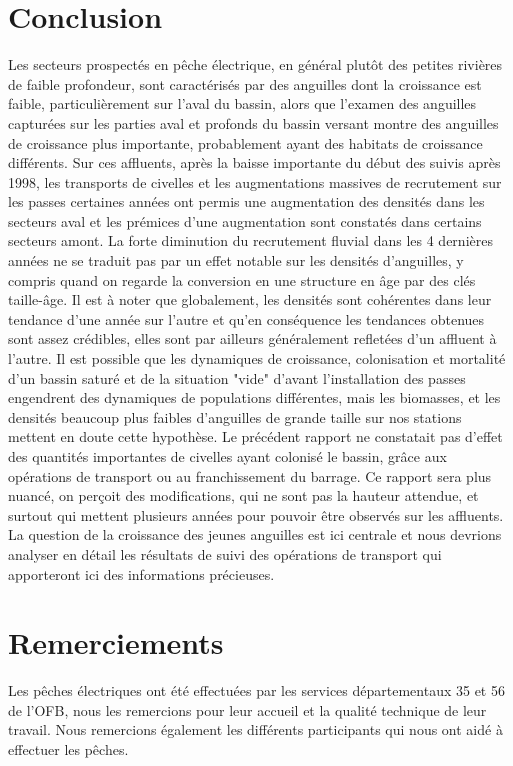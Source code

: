 \documentclass[10pt,twocolumn,titlepage,twoside]{article}\usepackage[]{graphicx}\usepackage[]{color}
\begin{document}
\section[Conclusion]{Conclusion}
Les secteurs prospectés en pêche électrique, en général plutôt des petites
rivières de faible profondeur, sont caractérisés par des anguilles dont la
croissance est faible, particulièrement sur l'aval du bassin, 
alors que l'examen des anguilles capturées sur les parties aval et profonds du bassin
versant montre des anguilles de croissance plus importante, probablement ayant
des habitats de croissance différents. Sur ces affluents, après la baisse
importante du début des suivis après 1998, les transports de civelles et les
augmentations massives de recrutement sur les passes certaines années ont permis
une augmentation des densités dans les secteurs aval et les prémices d'une
augmentation sont constatés dans certains secteurs amont. 
La forte diminution du recrutement fluvial dans les 4 dernières années ne se
traduit pas par un effet notable sur les densités d'anguilles, y compris quand
on regarde la conversion en une structure en âge par des clés taille-âge.
Il est à noter que globalement, les densités sont cohérentes dans leur tendance d'une année sur 
l'autre et qu'en conséquence les tendances
obtenues sont assez crédibles, elles sont par ailleurs généralement refletées
d'un affluent à l'autre.
Il est possible que les dynamiques de croissance, colonisation et mortalité d'un
bassin saturé et de la situation "vide" d'avant l'installation des passes
engendrent des dynamiques de populations différentes, mais les biomasses, et les
densités beaucoup plus faibles d'anguilles de grande taille sur nos stations
mettent en doute cette hypothèse.
Le précédent rapport ne constatait pas d'effet des quantités importantes de
civelles ayant colonisé le bassin, grâce aux opérations de transport ou au
franchissement du barrage. Ce rapport sera plus nuancé, on perçoit des
modifications, qui ne sont pas la hauteur attendue, et surtout qui mettent
plusieurs années pour pouvoir être observés sur les affluents. La question de
la croissance des jeunes anguilles est ici centrale et nous devrions analyser
en détail les résultats de suivi des opérations de transport qui apporteront
ici des informations précieuses. 

\section*{Remerciements} 
Les pêches électriques ont été effectuées par les services départementaux 35 et
56 de l'OFB, nous les remercions pour leur accueil et la qualité technique de
leur travail.
Nous remercions également les différents participants qui nous ont aidé à
effectuer les pêches.
\clearpage
\onecolumn
\printbibliography
\normalsize
\clearpage
\end{document}
